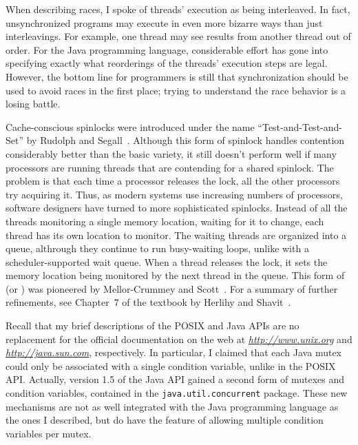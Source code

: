 When describing races, I spoke of threads' execution as being
interleaved.  In fact, unsynchronized programs may execute in even
more bizarre ways than just interleavings.  For example, one thread
may see results from another thread out of order.  For the Java programming
language, considerable effort has gone into specifying exactly what
reorderings of the threads' execution steps are legal.  However, the
bottom line for programmers is still that synchronization should be
used to avoid races in the first place; trying to understand the race
behavior is a losing battle.

Cache-conscious spinlocks were introduced under the name ``Test-and-Test-and-Set'' by Rudolph and Segall~\cite{max1200}.  Although this form of spinlock handles contention considerably better than the basic variety, it still doesn't perform well if many processors are running threads that are contending for a shared spinlock.  The problem is that each time a processor releases the lock, all the other processors try acquiring it. Thus, as modern systems use increasing numbers of processors, software designers have turned to more sophisticated spinlocks.  Instead of all the threads monitoring a single memory location, waiting for it to change, each thread has its own location to monitor.  The waiting threads are organized into a queue, althrough they continue to run busy-waiting loops, unlike with a scheduler-supported wait queue.  When a thread releases the lock, it sets the memory location being monitored by the next thread in the queue.  This form of  (or ) was pioneered by Mellor-Crummey and Scott~\cite{max1201}. For a summary of further refinements, see Chapter~7 of the textbook by Herlihy and Shavit~\cite{max1202}.

Recall that my brief descriptions of the POSIX and Java APIs are no
replacement for the official documentation on the web at
\textit{\url{http://www.unix.org}} and \textit{\url{http://java.sun.com}}, respectively.  In particular, I claimed that each Java mutex could only be associated with a single condition variable, unlike in the POSIX API. Actually, version 1.5 of the Java API gained a second form of mutexes and condition variables, contained in the \verb|java.util.|\linebreak[0]\verb|concurrent| package. These new mechanisms are not as well integrated with the Java programming language as the ones I described, but do have the feature of allowing multiple condition variables per mutex.

